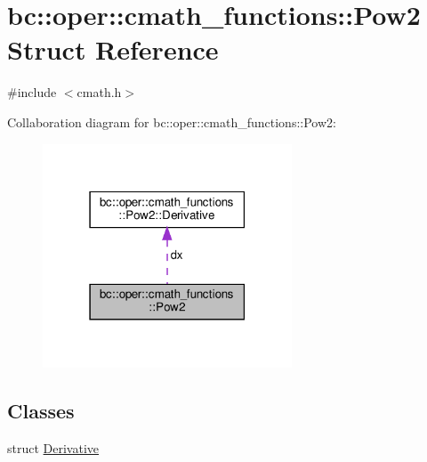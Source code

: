 \hypertarget{structbc_1_1oper_1_1cmath__functions_1_1Pow2}{}\section{bc\+:\+:oper\+:\+:cmath\+\_\+functions\+:\+:Pow2 Struct Reference}
\label{structbc_1_1oper_1_1cmath__functions_1_1Pow2}


{\ttfamily \#include $<$cmath.\+h$>$}



Collaboration diagram for bc\+:\+:oper\+:\+:cmath\+\_\+functions\+:\+:Pow2\+:\nopagebreak
\begin{figure}[H]
\begin{center}
\leavevmode
\includegraphics[width=210pt]{structbc_1_1oper_1_1cmath__functions_1_1Pow2__coll__graph}
\end{center}
\end{figure}
\subsection*{Classes}
\begin{DoxyCompactItemize}
\item 
struct \hyperlink{structbc_1_1oper_1_1cmath__functions_1_1Pow2_1_1Derivative}{Derivative}
\end{DoxyCompactItemize}
